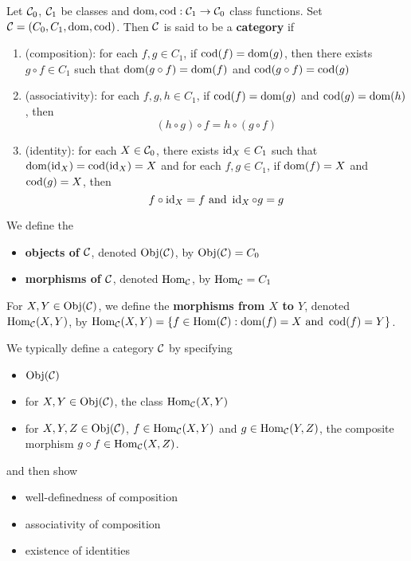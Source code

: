\documentclass{book}
\begin{document}
	\begin{defn}  
		Let $\mathcal{C}_0$, $\mathcal{C}_1$ be classes and $\operatorname{dom}, \operatorname{cod} : \mathcal{C}_1 \rightarrow \mathcal{C}_0$ class functions. Set $\mathcal{C} = (C_0, C_1, \operatorname{dom}, \operatorname{cod})$. Then $\mathcal{C}$ is said to be a \textbf{category} if 
		\begin{enumerate}
			\item (composition): for each $f,g \in C_1$, if $\operatorname{cod}(f) = \operatorname{dom}(g)$, then there exists $g \circ f \in C_1$ such that $\operatorname{dom}(g \circ f) = \operatorname{dom}(f)$ and $\operatorname{cod}(g \circ f) = \operatorname{cod}(g)$
			\item (associativity): for each $f,g,h \in C_1$, if $\operatorname{cod}(f) = \operatorname{dom}(g)$ and $\operatorname{cod}(g) = \operatorname{dom}(h)$, then $$(h \circ g) \circ f = h \circ (g \circ f)$$  
			\item (identity): for each $X \in \mathcal{C}_0$, there exists $\operatorname{id}_{X} \in C_1$ such that $\operatorname{dom}(\operatorname{id}_X) = \operatorname{cod}(\operatorname{id}_X) = X$ and for each $f, g \in C_1$, if $\operatorname{dom}(f) = X$ and $\operatorname{cod}(g) = X$, then $$f \circ \operatorname{id}_X = f \text{ and } \operatorname{id}_X \circ g = g$$ 
		\end{enumerate}
		We define the
		\begin{itemize}
			\item \textbf{objects of $\mathcal{C}$}, denoted $\operatorname{Obj}(\mathcal{C})$, by $\operatorname{Obj}(\mathcal{C}) = C_0$
			\item \textbf{morphisms of $\mathcal{C}$}, denoted $\operatorname{Hom}_{\mathcal{C}}$, by $\operatorname{Hom}_{\mathcal{C}} = C_1$
		\end{itemize}
		For $X, Y \in \operatorname{Obj}(\mathcal{C})$, we define the \textbf{morphisms from $X$ to $Y$}, denoted $\operatorname{Hom}_{\mathcal{C}}(X, Y)$, by $\operatorname{Hom}_{\mathcal{C}}(X, Y) = \{f \in \operatorname{Hom}(\mathcal{C}): \operatorname{dom}(f) = X \text{ and } \operatorname{cod}(f) = Y\}$.
	\end{defn}

	\begin{note} 
		We typically define a category $\mathcal{C}$ by specifying 
		\begin{itemize}
			\item $\operatorname{Obj}(\mathcal{C})$
			\item for $X,Y \in \operatorname{Obj}(\mathcal{C})$, the class $\operatorname{Hom}_{\mathcal{C}}(X, Y)$
			\item for $X,Y,Z \in \operatorname{Obj}(\mathcal{C})$, $f \in \operatorname{Hom}_{\mathcal{C}}(X, Y)$ and $g \in \operatorname{Hom}_{\mathcal{C}}(Y, Z)$, the composite morphism $g \circ f \in \operatorname{Hom}_{\mathcal{C}}(X,Z)$.
		\end{itemize}
		and then show 
		\begin{itemize}
			\item well-definedness of composition
			\item associativity of composition 
			\item existence of identities 
		\end{itemize}
	\end{note}
\end{document}
